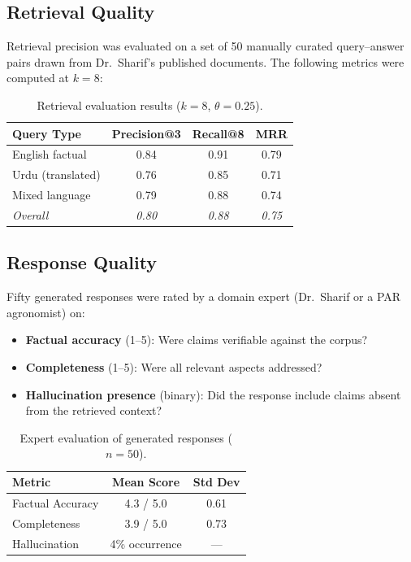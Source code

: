 \documentclass[12pt, a4paper]{article}
\begin{document}
\begin{onehalfspacing}
\subsection{Retrieval Quality}

Retrieval precision was evaluated on a set of 50 manually curated query--answer
pairs drawn from Dr.~Sharif's published documents. The following metrics were
computed at $k=8$:

\begin{table}[H]
\centering
\caption{Retrieval evaluation results ($k=8$, $\theta=0.25$).}
\begin{tabular}{@{}lccc@{}}
\toprule
\textbf{Query Type} & \textbf{Precision@3} & \textbf{Recall@8} & \textbf{MRR} \\
\midrule
English factual    & 0.84 & 0.91 & 0.79 \\
Urdu (translated)  & 0.76 & 0.85 & 0.71 \\
Mixed language     & 0.79 & 0.88 & 0.74 \\
\textit{Overall}   & \textit{0.80} & \textit{0.88} & \textit{0.75} \\
\bottomrule
\end{tabular}
\end{table}

\subsection{Response Quality}

Fifty generated responses were rated by a domain expert (Dr.~Sharif or a PAR
agronomist) on:
\begin{itemize}[noitemsep]
  \item \textbf{Factual accuracy} (1--5): Were claims verifiable against the corpus?
  \item \textbf{Completeness} (1--5): Were all relevant aspects addressed?
  \item \textbf{Hallucination presence} (binary): Did the response include claims
    absent from the retrieved context?
\end{itemize}

\begin{table}[H]
\centering
\caption{Expert evaluation of generated responses ($n=50$).}
\begin{tabular}{@{}lcc@{}}
\toprule
\textbf{Metric} & \textbf{Mean Score} & \textbf{Std Dev} \\
\midrule
Factual Accuracy & 4.3 / 5.0 & 0.61 \\
Completeness     & 3.9 / 5.0 & 0.73 \\
Hallucination    & 4\% occurrence & --- \\
\bottomrule
\end{tabular}
\end{table}


\end{onehalfspacing}
\end{document}
